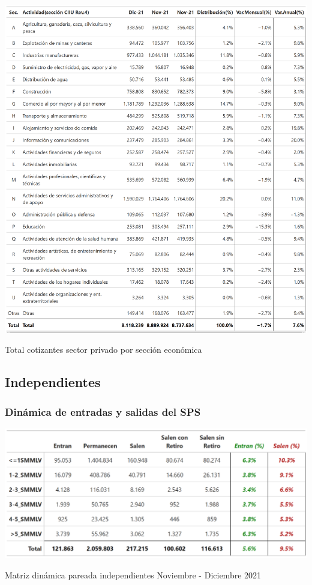 \begin{table}[!htbp]
\label{tabla:sector_privado:actividad_economica}
\centering
\includegraphics[width = 18cm]{results/02_longitudinal/salida_act_econ_dependientes_21.png}
\caption{Total cotizantes sector privado  por sección económica}%
\end{table}



\FloatBarrier
\subsection{Independientes}

\subsubsection{Dinámica de entradas y salidas del SPS}
\begin{table}[!htbp]
\label{tabla:independientes:matriz_dinamica_mes_12_2021}
\centering
\includegraphics[width = 15cm]{results/02_longitudinal/salida_resumen_independientes_interes_21.png}
\caption{Matriz dinámica pareada independientes Noviembre - Diciembre 2021}%
\end{table}

